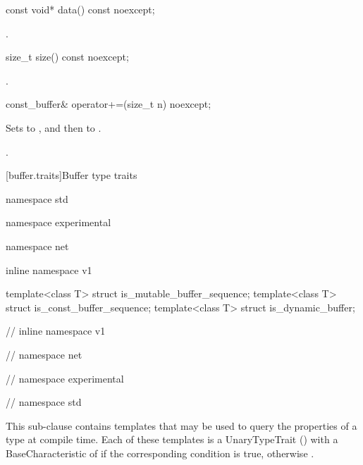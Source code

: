 %
\begin{itemdecl}
const void* data() const noexcept;
\end{itemdecl}

\begin{itemdescr}
\pnum
\returns {}.
\end{itemdescr}

%
\begin{itemdecl}
size_t size() const noexcept;
\end{itemdecl}

\begin{itemdescr}
\pnum
\returns {}.
\end{itemdescr}

%
\begin{itemdecl}
const_buffer& operator+=(size_t n) noexcept;
\end{itemdecl}

\begin{itemdescr}
\pnum
\effects Sets  to , and then  to .

\pnum
\returns {}.
\end{itemdescr}


[buffer.traits]{Buffer type traits}

%
%
%
\begin{codeblock}
namespace std {
namespace experimental {
namespace net {
inline namespace v1 {

  template<class T> struct is_mutable_buffer_sequence;
  template<class T> struct is_const_buffer_sequence;
  template<class T> struct is_dynamic_buffer;

} // inline namespace v1
} // namespace net
} // namespace experimental
} // namespace std
\end{codeblock}

\pnum
This sub-clause contains templates that may be used to query the properties of a type at compile time. Each of these templates is a UnaryTypeTrait () with a BaseCharacteristic of  if the corresponding condition is true, otherwise .

